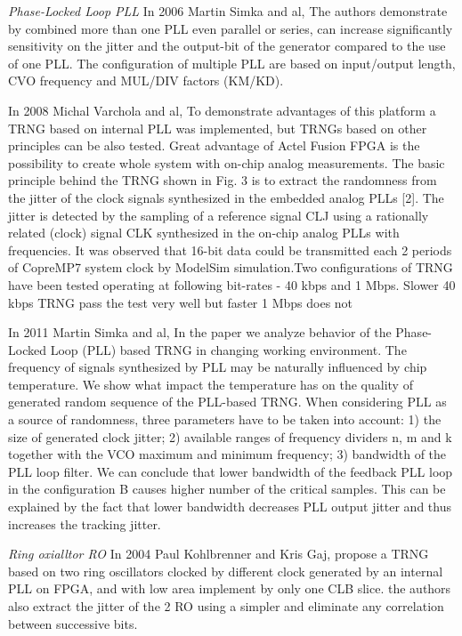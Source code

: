 \textit{Phase-Locked Loop PLL}
In 2006 Martin Simka and al, The authors demonstrate by combined more than one PLL even parallel or series, can increase significantly sensitivity on the jitter and the output-bit of the generator compared to the use of one PLL. The configuration of multiple PLL are based on input/output length, CVO frequency and MUL/DIV factors (KM/KD).

In 2008 Michal Varchola and al, To demonstrate advantages of this platform a TRNG based on internal PLL was implemented, but TRNGs based on other principles can be also tested. Great advantage of Actel Fusion FPGA is the possibility to create whole system with on-chip analog measurements. The basic principle behind the TRNG shown in Fig. 3 is to extract the randomness from the jitter of the clock signals synthesized in the embedded analog PLLs [2]. The jitter is detected by the sampling of a reference signal CLJ using a rationally related (clock) signal CLK synthesized in the on-chip analog PLLs with frequencies. It was observed that 16-bit data could be transmitted each 2 periods of CopreMP7 system clock by ModelSim simulation.Two configurations of TRNG have been tested operating at following bit-rates - 40 kbps and 1 Mbps. Slower 40 kbps TRNG pass the test very well but faster 1 Mbps does not

In 2011 Martin Simka and al, In the paper we analyze behavior of the Phase-Locked Loop (PLL) based TRNG in changing working environment. The frequency of signals synthesized by PLL may be naturally influenced by chip temperature. We show what impact the temperature has on the quality of generated random sequence of the PLL-based TRNG. When considering PLL as a source of randomness, three parameters have to be taken into account: 1) the size of generated clock jitter; 2) available ranges of frequency dividers n, m and k together with the VCO maximum and minimum frequency; 3) bandwidth of the PLL loop filter. We can conclude that lower bandwidth of the feedback PLL loop in the configuration B causes higher number of the critical samples. This can be explained by the fact that lower bandwidth decreases PLL output jitter and thus increases the tracking jitter.  

\textit{Ring oxialltor RO}
In 2004 Paul Kohlbrenner and Kris Gaj, propose a TRNG based on two ring oscillators clocked by different clock generated by an internal PLL on FPGA, and with low area implement by only one CLB slice. the authors also extract the jitter of the 2 RO using a simpler and eliminate any correlation between successive bits.

